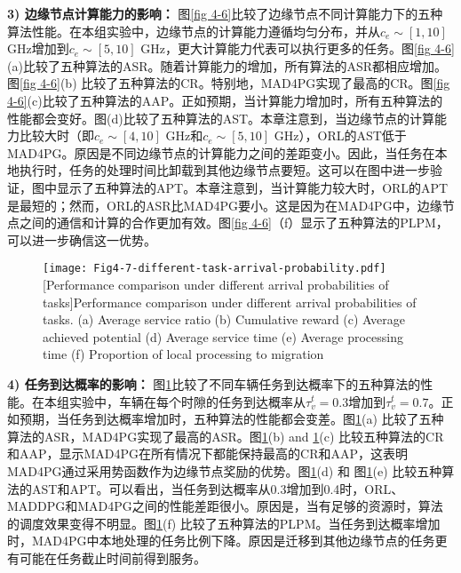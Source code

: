 \textbf{3) 边缘节点计算能力的影响：} 图\ref{fig 4-6}比较了边缘节点不同计算能力下的五种算法性能。在本组实验中，边缘节点的计算能力遵循均匀分布，并从$c_e\sim[1, 10]$ GHz增加到$c_e\sim[5, 10]$ GHz，更大计算能力代表可以执行更多的任务。图\ref{fig 4-6}(a)比较了五种算法的ASR。随着计算能力的增加，所有算法的ASR都相应增加。图\ref{fig 4-6}(b) 比较了五种算法的CR。特别地，MAD4PG实现了最高的CR。图\ref{fig 4-6}(c)比较了五种算法的AAP。正如预期，当计算能力增加时，所有五种算法的性能都会变好。图(d)比较了五种算法的AST。本章注意到，当边缘节点的计算能力比较大时（即$c_e\sim[4,10]$ GHz和$c_e\sim[5,10]$ GHz），ORL的AST低于MAD4PG。原因是不同边缘节点的计算能力之间的差距变小。因此，当任务在本地执行时，任务的处理时间比卸载到其他边缘节点要短。这可以在图中进一步验证，图中显示了五种算法的APT。本章注意到，当计算能力较大时，ORL的APT是最短的；然而，ORL的ASR比MAD4PG要小。这是因为在MAD4PG中，边缘节点之间的通信和计算的合作更加有效。图\ref{fig 4-6}（f）显示了五种算法的PLPM，可以进一步确信这一优势。

\begin{figure}[h]
\centering
  \texttt{[image: Fig4-7-different-task-arrival-probability.pdf]}
  [Performance comparison under different arrival probabilities of tasks]{Performance comparison under different arrival probabilities of tasks. (a) Average service ratio (b) Cumulative reward (c) Average achieved potential (d) Average service time (e) Average processing time (f) Proportion of local processing to migration}
  \label{fig 4-7}
\end{figure} 

\textbf{4) 任务到达概率的影响：} 图\ref{fig 4-7}比较了不同车辆任务到达概率下的五种算法的性能。在本组实验中，车辆在每个时隙的任务到达概率从$\tau_{v}^{t}=0.3$增加到$\tau_{v}^{t}=0.7$。正如预期，当任务到达概率增加时，五种算法的性能都会变差。图\ref{fig 4-7}(a) 比较了五种算法的ASR，MAD4PG实现了最高的ASR。图\ref{fig 4-7}(b) and \ref{fig 4-7}(c) 比较五种算法的CR和AAP，显示MAD4PG在所有情况下都能保持最高的CR和AAP，这表明MAD4PG通过采用势函数作为边缘节点奖励的优势。图\ref{fig 4-7}(d) 和 图\ref{fig 4-7}(e) 比较五种算法的AST和APT。可以看出，当任务到达概率从0.3增加到0.4时，ORL、MADDPG和MAD4PG之间的性能差距很小。原因是，当有足够的资源时，算法的调度效果变得不明显。图\ref{fig 4-7}(f) 比较了五种算法的PLPM。当任务到达概率增加时，MAD4PG中本地处理的任务比例下降。原因是迁移到其他边缘节点的任务更有可能在任务截止时间前得到服务。


